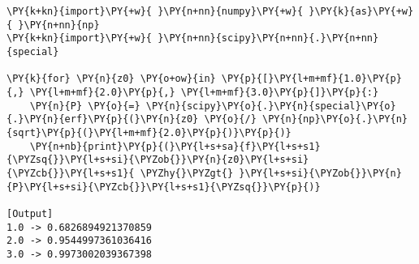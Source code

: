 \begin{Verbatim}[label=\makebox{\href{https://github.com/unipi-physics-labs/lab1-notes/tree/main/snippy/scipy.special.erf.py}{https://github.com/.../scipy.special.erf.py}},commandchars=\\\{\}]
\PY{k+kn}{import}\PY{+w}{ }\PY{n+nn}{numpy}\PY{+w}{ }\PY{k}{as}\PY{+w}{ }\PY{n+nn}{np}
\PY{k+kn}{import}\PY{+w}{ }\PY{n+nn}{scipy}\PY{n+nn}{.}\PY{n+nn}{special}

\PY{k}{for} \PY{n}{z0} \PY{o+ow}{in} \PY{p}{[}\PY{l+m+mf}{1.0}\PY{p}{,} \PY{l+m+mf}{2.0}\PY{p}{,} \PY{l+m+mf}{3.0}\PY{p}{]}\PY{p}{:}
    \PY{n}{P} \PY{o}{=} \PY{n}{scipy}\PY{o}{.}\PY{n}{special}\PY{o}{.}\PY{n}{erf}\PY{p}{(}\PY{n}{z0} \PY{o}{/} \PY{n}{np}\PY{o}{.}\PY{n}{sqrt}\PY{p}{(}\PY{l+m+mf}{2.0}\PY{p}{)}\PY{p}{)}
    \PY{n+nb}{print}\PY{p}{(}\PY{l+s+sa}{f}\PY{l+s+s1}{\PYZsq{}}\PY{l+s+si}{\PYZob{}}\PY{n}{z0}\PY{l+s+si}{\PYZcb{}}\PY{l+s+s1}{ \PYZhy{}\PYZgt{} }\PY{l+s+si}{\PYZob{}}\PY{n}{P}\PY{l+s+si}{\PYZcb{}}\PY{l+s+s1}{\PYZsq{}}\PY{p}{)}

[Output]
1.0 -> 0.6826894921370859
2.0 -> 0.9544997361036416
3.0 -> 0.9973002039367398
\end{Verbatim}
